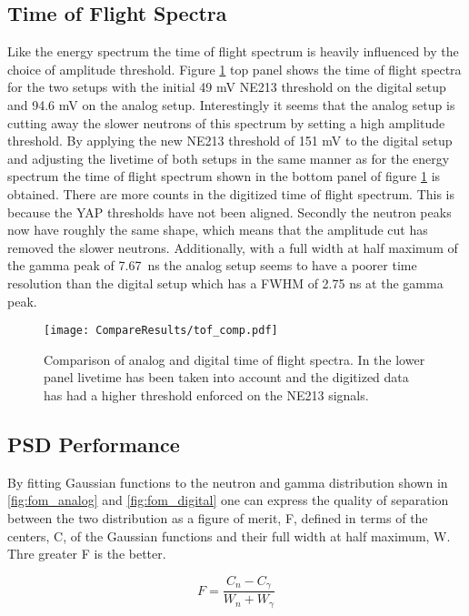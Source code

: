 \documentclass[main.tex]{subfiles}
\begin{document}
\subsection{Time of Flight Spectra}
Like the energy spectrum the time of flight spectrum is heavily influenced by the choice of amplitude threshold. Figure \ref{fig:tof_comp} top panel shows the time of flight spectra for the two setups with the initial 49 mV NE213 threshold on the digital setup and 94.6 mV on the analog setup. Interestingly it seems that the analog setup is cutting away the slower neutrons of this spectrum by setting a high amplitude threshold. By applying the new NE213 threshold of 151 mV to the digital setup and adjusting the livetime of both setups in the same manner as for the energy spectrum the time of flight spectrum shown in the bottom panel of figure \ref{fig:tof_comp} is obtained. There are more counts in the digitized time of flight spectrum. This is because the YAP thresholds have not been aligned. Secondly the neutron peaks now have roughly the same shape, which means that the amplitude cut has removed the slower neutrons. Additionally, with a full width at half maximum of the gamma peak of \SI{7.67}{\ns} the analog setup seems to have a poorer time resolution than the digital setup which has a FWHM of 2.75 ns at the gamma peak.

\begin{figure}[h]
    \centering
        \texttt{[image: CompareResults/tof\_comp.pdf]}
        \caption[Comparison of analog and digital time of flight spectra.]{Comparison of analog and digital time of flight spectra. In the lower panel livetime has been taken into account and the digitized data has had a higher threshold enforced on the NE213 signals.}
    \label{fig:tof_comp}
\end{figure}

\subsection{PSD Performance}
By fitting Gaussian functions to the neutron and gamma distribution shown in \ref{fig:fom_analog} and \ref{fig:fom_digital} one can express the quality of separation between the two distribution as a figure of merit, F, defined in terms of the centers, C, of the Gaussian functions and their full width at half maximum, W. Thre greater F is the better.

\begin{equation}
F = \frac{C_n - C_\gamma}{W_n + W_\gamma}
\end{equation}
\end{document}
